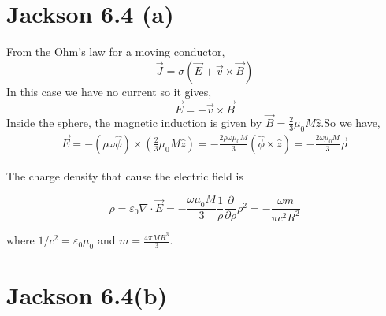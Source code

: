 \documentclass{article}
\newcommand{\pd}[2]{\frac{\partial#1}{\partial#2}}
\begin{document}
\pagebreak

\section*{Jackson 6.4 (a)}

From the Ohm's law for a moving conductor,
\[ \vec J=\sigma(\vec E+\vec v\times\vec B) \]
In this case we have no current so it gives,
\[\vec E=-\vec v\times\vec B\]
Inside the sphere, the magnetic induction is given by $\vec B=\frac{2}{3}\mu_0M\hat z$.So we have,
\begin{align*}
  \vec E=-(\rho\omega\hat\phi)\times(\frac{2}{3}\mu_0M\hat z)=-\frac{2\rho\omega\mu_0M}{3}(\hat\phi\times\hat z)=-\frac{2\omega\mu_0M}{3}\vec \rho
\end{align*}

The charge density that cause the electric field is

\[ \rho=\varepsilon_0\nabla\cdot\vec E=-\frac{\omega\mu_0M}{3}\frac{1}{\rho}\pd{}{\rho}\rho^2=-\frac{\omega m}{\pi c^2 R^2} \]

where $1/c^2=\varepsilon_0\mu_0$ and $m=\frac{4\pi M R^3}{3}$.

\section*{Jackson 6.4(b)}
\end{document}
